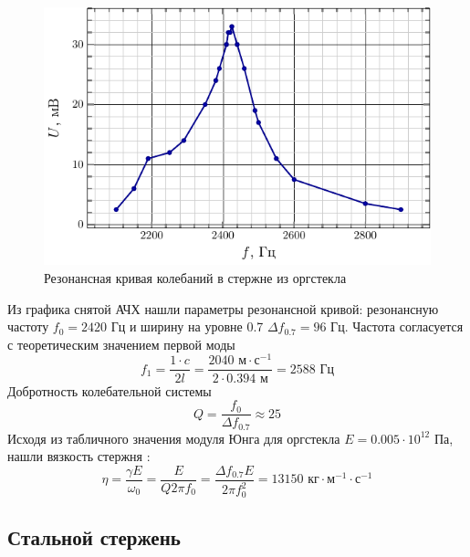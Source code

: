 \begin{figure}[H]
	\centering
	\includegraphics[scale=1.5]{fig/glass_afc}
	\caption{Резонансная кривая колебаний в стержне из оргстекла}
	\label{fig:chem1}
\end{figure}

Из графика снятой АЧХ нашли параметры резонансной кривой: резонансную частоту
$f_0=2420\text{ Гц}$ и ширину на уровне 0.7 $\Delta f_{0.7} = 96\text{ Гц}$. 
Частота согласуется с теоретическим значением первой моды
\begin{equation}
	f_1 = \frac{1\cdot c}{2l} = \frac{2040 \text{ м}\cdot\text{с}^{-1}}{2\cdot 0.394\text{ м}}=2588 \text{ Гц}
\end{equation}
Добротность колебательной системы
\begin{equation}
	Q = \frac{f_0}{\Delta f_{0.7}} \approx 25
\end{equation}
Исходя из табличного значения модуля Юнга для оргстекла $E=0.005\cdot10^{12}$ Па, нашли вязкость стержня  \cite[стр. 10]{met}:
\begin{equation}
	\eta = \frac{\gamma E}{\omega_0}= \frac{ E}{Q 2\pi f_0} = \frac{\Delta f_{0.7} E}{2\pi f_0^2} = 13150 \text{ кг}\cdot\text{м}^{-1}\cdot\text{с}^{-1}
\end{equation}


\subsection{Стальной стержень}

